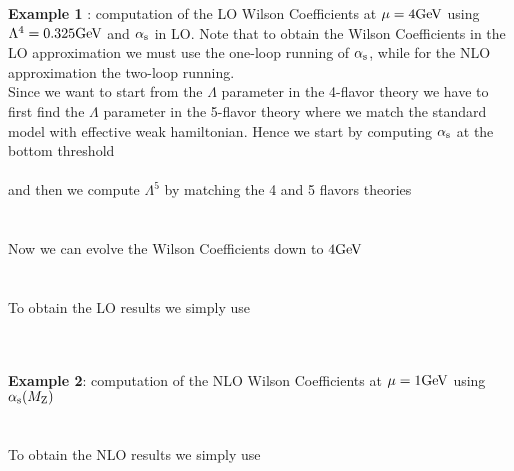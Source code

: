 
\hrulefill

\textbf{Example 1} : computation of the LO Wilson Coefficients at $\mu=4 \mathrm{GeV}$ using $\Lambda^4 = 0.325 \mathrm{GeV}$ 
and $\alpha_{\rm s}$ in LO. Note that to obtain the Wilson Coefficients in the LO approximation 
we must use the one-loop running of $\alpha_{\rm s}$, while for the NLO approximation the two-loop running.\\

Since we want to start from the $\Lambda$ parameter in the 4-flavor theory we have to first 
find the $\Lambda$ parameter in the 5-flavor theory where we match the standard model with 
effective weak hamiltonian. Hence we start by computing $\alpha_{\rm s}$ at the bottom threshold\\
\\
and then we compute $\Lambda^5$ by matching the 4 and 5 flavors theories\\
\\
\\

Now we can evolve the Wilson Coefficients down to $4 \mathrm{GeV}$\\
\\
\\

To obtain the LO results we simply use\\
\\
\\

\hrulefill

\textbf{Example 2}: computation of the NLO Wilson Coefficients at $\mu=1 \mathrm{GeV}$ using $\alpha_{\rm s}(M_{\mathrm Z})$\\
\\
\\

To obtain the NLO results we simply use\\
\\

